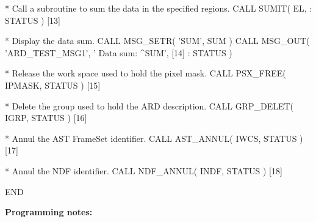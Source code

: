 \documentclass[11pt,nolof]{starlink}
\begin{document}
\begin{terminalv}
*  Call a subroutine to sum the data in the specified regions.
      CALL SUMIT( EL, %
     :            STATUS )                                      [13]

*  Display the data sum.
      CALL MSG_SETR( 'SUM', SUM )
      CALL MSG_OUT( 'ARD_TEST_MSG1', '  Data sum: ^SUM',        [14]
     :               STATUS )

*  Release the work space used to hold the pixel mask.
      CALL PSX_FREE( IPMASK, STATUS )                           [15]

*  Delete the group used to hold the ARD description.
      CALL GRP_DELET( IGRP, STATUS )                            [16]

*  Annul the AST FrameSet identifier.
      CALL AST_ANNUL( IWCS, STATUS )                            [17]

*  Annul the NDF identifier.
      CALL NDF_ANNUL( INDF, STATUS )                            [18]

      END
\end{terminalv}
\normalsize

\textbf{Programming notes:}
\end{document}
